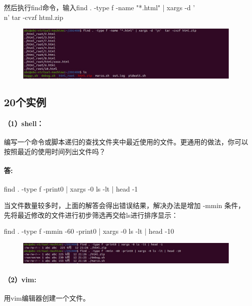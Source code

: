 \documentclass[a4paper, 12pt]{article}
\begin{document}
	然后执行find命令，输入find . -type f -name "*.html" | xargs -d '\\n'  tar -cvzf html.zip
	
	\begin{figure}[H]
	\centering
	\includegraphics[width=1\textwidth]{016.jpg}
	\end{figure}
	
	\subsection{20个实例}
	
	\paragraph{（1）shell：}
	编写一个命令或脚本递归的查找文件夹中最近使用的文件。更通用的做法，你可以按照最近的使用时间列出文件吗？
	
	\paragraph{答:}
	find . -type f -print0 | xargs -0 ls -lt | head -1
	
	当文件数量较多时，上面的解答会得出错误结果，解决办法是增加 -mmin 条件，先将最近修改的文件进行初步筛选再交给ls进行排序显示：
	
	 find . -type f -mmin -60 -print0 | xargs -0 ls -lt | head -10
	
	\begin{figure}[H]
		\centering
		\includegraphics[width=1\textwidth]{017.jpg}
	\end{figure}
	
	\paragraph{（2）vim:}
	用vim编辑器创建一个文件。
	
\end{document}
